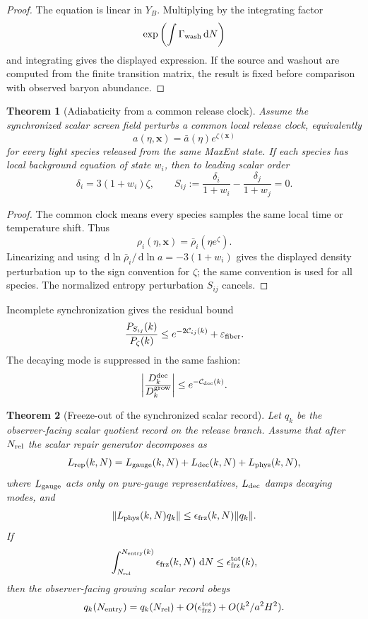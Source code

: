 \documentclass[11pt]{article}
\newtheorem{theorem}{Theorem}[section]
\newcommand{\dd}{\,\mathrm d}
\begin{document}
\begin{proof}
The equation is linear in \(Y_B\). Multiplying by the integrating factor
\[
\exp\left(\int\Gamma_{\rm wash}\dd N\right)
\]
and integrating gives the displayed expression. If the source and washout are computed from the
finite transition matrix, the result is fixed before comparison with observed baryon abundance.
\end{proof}

\begin{theorem}[Adiabaticity from a common release clock]\label{thm:adiabatic}
Assume the synchronized scalar screen field perturbs a common local release clock, equivalently
\[
a(\eta,\mathbf x)=\bar a(\eta)e^{\zeta(\mathbf x)}
\]
for every light species released from the same MaxEnt state. If each species has local background
equation of state \(w_i\), then to leading scalar order
\[
\delta_i=3(1+w_i)\zeta,
\qquad
S_{ij}
:=
\frac{\delta_i}{1+w_i}
-
\frac{\delta_j}{1+w_j}
=0.
\]
\end{theorem}

\begin{proof}
The common clock means every species samples the same local time or temperature shift. Thus
\[
\rho_i(\eta,\mathbf x)=\bar\rho_i(\eta e^{\zeta}).
\]
Linearizing and using \(\dd\ln\bar\rho_i/\dd\ln a=-3(1+w_i)\) gives the displayed density
perturbation up to the sign convention for \(\zeta\); the same convention is used for all species.
The normalized entropy perturbation \(S_{ij}\) cancels.
\end{proof}

Incomplete synchronization gives the residual bound
\[
\frac{P_{S_{ij}}(k)}{P_\zeta(k)}
\le
e^{-2\mathcal C_{ij}(k)}+\varepsilon_{\rm fiber}.
\]
The decaying mode is suppressed in the same fashion:
\[
\left|
\frac{D_k^{\rm dec}}{D_k^{\rm grow}}
\right|
\le
e^{-\mathcal C_{\rm dec}(k)}.
\]

\begin{theorem}[Freeze-out of the synchronized scalar record]\label{thm:scalar-freezeout}
Let \(q_k\) be the observer-facing scalar quotient record on the release branch. Assume that after
\(N_{\rm rel}\) the scalar repair generator decomposes as
\[
L_{\rm rep}(k,N)
=
L_{\rm gauge}(k,N)+L_{\rm dec}(k,N)+L_{\rm phys}(k,N),
\]
where \(L_{\rm gauge}\) acts only on pure-gauge representatives, \(L_{\rm dec}\) damps decaying
modes, and
\[
\|L_{\rm phys}(k,N)q_k\|
\le
\epsilon_{\rm frz}(k,N)\|q_k\|.
\]
If
\[
\int_{N_{\rm rel}}^{N_{\rm entry}(k)}
\epsilon_{\rm frz}(k,N)\,\dd N
\le
\epsilon_{\rm frz}^{\rm tot}(k),
\]
then the observer-facing growing scalar record obeys
\[
q_k(N_{\rm entry})
=
q_k(N_{\rm rel})
+
O(\epsilon_{\rm frz}^{\rm tot})
+
O(k^2/a^2H^2).
\]
\end{theorem}
\end{document}
